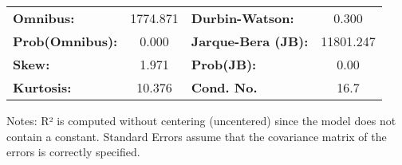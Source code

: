 \begin{center}
\begin{tabular}{lcccccc}
\bottomrule
\end{tabular}
\begin{tabular}{lclc}
\textbf{Omnibus:}       & 1774.871 & \textbf{  Durbin-Watson:     } &     0.300  \\
\textbf{Prob(Omnibus):} &   0.000  & \textbf{  Jarque-Bera (JB):  } & 11801.247  \\
\textbf{Skew:}          &   1.971  & \textbf{  Prob(JB):          } &      0.00  \\
\textbf{Kurtosis:}      &  10.376  & \textbf{  Cond. No.          } &      16.7  \\
\bottomrule
\end{tabular}
\end{center}

Notes: \newline
 [1] R² is computed without centering (uncentered) since the model does not contain a constant. \newline
 [2] Standard Errors assume that the covariance matrix of the errors is correctly specified.